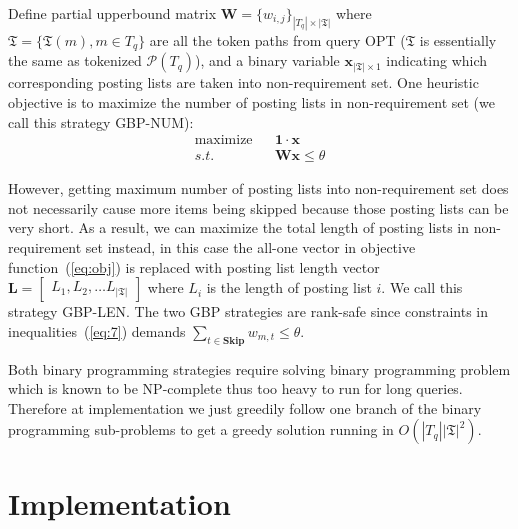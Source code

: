 \documentclass[runningheads]{llncs}
\begin{document}
Define partial upperbound matrix $\mathbf{W} = \{ w_{i, j} \}_{|T_q| \times |\mathfrak{T}|} $ where $\mathfrak{T} = \{ \mathfrak{T}(m), m \in T_q \}$ are all the token paths from query OPT ($\mathfrak{T}$ is essentially the same as tokenized $\mathcal{P}(T_q)$), and a binary variable $\boldsymbol{x}_{|\mathfrak{T}| \times 1}$ indicating which corresponding posting lists are taken into non-requirement set.
One heuristic objective is to maximize the number of posting lists in non-requirement set (we call this strategy GBP-NUM):
\begin{align}
\label{eq:obj}
\text{maximize} && \mathbf{1} \cdot \boldsymbol{x} \\
\label{eq:7}
s.t.            && \mathbf{W} \boldsymbol{x} \le \theta
\end{align}

However, getting maximum number of posting lists into non-requirement set does not necessarily cause more items being skipped because those posting lists can be very short.
As a result, we can maximize the total length of posting lists in non-requirement set instead, in this case the all-one vector in objective function~(\ref{eq:obj}) is replaced with posting list length vector
$\mathbf{L} = \begin{bmatrix} L_1, L_2, \ldots L_{|\mathfrak{T}|}\end{bmatrix}$ where $L_i$ is the length of posting list $i$.
We call this strategy GBP-LEN.
%
The two GBP strategies are rank-safe %
since constraints in inequalities~(\ref{eq:7}) demands $\sum_{t \in \textbf{Skip}} w_{m,t} \le \theta$.

Both binary programming strategies require solving binary programming problem which is known to be NP-complete thus too heavy to run for long queries.
Therefore at implementation we just greedily follow one branch of the binary programming sub-problems to get a greedy solution running in $O(|T_q| |\mathfrak{T}|^2)$.

\section{Implementation}
\end{document}
